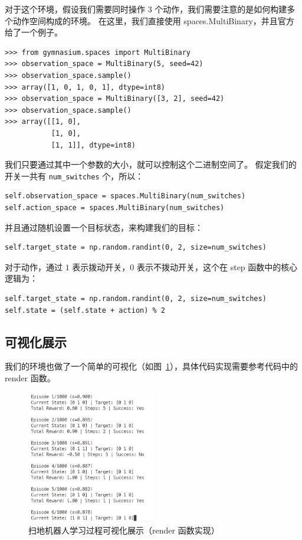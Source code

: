\documentclass[citestyle=gb7714-2015, bibstyle=gb7714-2015,lang=cn,14pt,scheme=chinese]{elegantbook}
\begin{document}
对于这个环境，假设我们需要同时操作 \(3\) 个动作，我们需要注意的是如何构建多个动作空间构成的环境。
在这里，我们直接使用 \textsf{spaces.MultiBinary}，并且官方给了一个例子。
\begin{verbatim}
>>> from gymnasium.spaces import MultiBinary
>>> observation_space = MultiBinary(5, seed=42)
>>> observation_space.sample()
>>> array([1, 0, 1, 0, 1], dtype=int8)
>>> observation_space = MultiBinary([3, 2], seed=42)
>>> observation_space.sample()
>>> array([[1, 0],
           [1, 0],
           [1, 1]], dtype=int8)
\end{verbatim}
我们只要通过其中一个参数的大小，就可以控制这个二进制空间了。
假定我们的开关一共有 \texttt{num\_switches} 个，所以：
\begin{verbatim}
self.observation_space = spaces.MultiBinary(num_switches)
self.action_space = spaces.MultiBinary(num_switches)
\end{verbatim}
并且通过随机设置一个目标状态，来构建我们的目标：
\begin{verbatim}
self.target_state = np.random.randint(0, 2, size=num_switches)
\end{verbatim}
对于动作，通过 \(1\) 表示拨动开关，\(0\) 表示不拨动开关，这个在 \textsf{step} 函数中的核心逻辑为：
\begin{verbatim}
self.target_state = np.random.randint(0, 2, size=num_switches)
self.state = (self.state + action) % 2
\end{verbatim}

\subsection{可视化展示}

我们的环境也做了一个简单的可视化（如图~\ref{fig:multiswitch-env-render}），具体代码实现需要参考代码中的 \textsf{render} 函数。

\begin{figure}[H]
    \centering
    \includegraphics[width=0.5\textwidth]{image/multi-switch-env_render1.jpg}
    \caption{扫地机器人学习过程可视化展示（\textsf{render} 函数实现）}\label{fig:multiswitch-env-render}
\end{figure}
\end{document}
